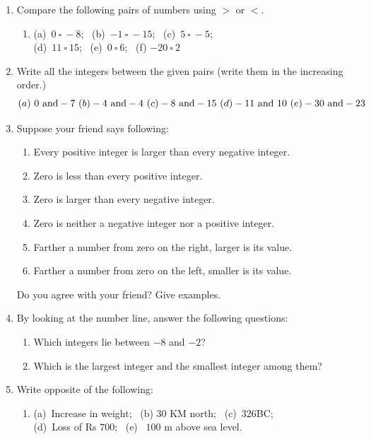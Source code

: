 \documentclass[a4paper,leqno,12pt]{amsart}
\begin{document}
\begin{enumerate}
\setlength\itemsep{1em}
\item Compare the following pairs of numbers using $>$ or $<$.
\begin{enumerate}
\item[] (a)\ $0 \ \square \ -8$; \ (b)\ $-1\ \square \ -15$; \ (c)\ $5\ \square \ -5$; \\ 
(d)\ $11\ \square \ 15$; \ (e)\ $0\ \square \ 6$; \ (f) $-20\ \square \ 2$
\end{enumerate}

\item Write all the integers between the given pairs (write them in the increasing
order.)
\[
(a)\ 0 \ {\rm and} -7 \ (b) -4 \ {\rm and} -4 \ (c) -8 \ {\rm and} -15 \ (d) -11 \ {\rm and} \ 10 \ (e) -30 \ {\rm and} -23
\]
\item Suppose your friend says following:
\begin{enumerate}
\item Every positive integer is larger than every negative integer.
\item Zero is less than every positive integer.
\item Zero is larger than every negative integer.
\item Zero is neither a negative integer nor a positive integer.
\item Farther a number from zero on the right, larger is its value.
\item Farther a number from zero on the left, smaller is its value.
\end{enumerate}
Do you agree with your friend? Give examples.

\item By looking at the number line, answer the following questions:
\begin{enumerate}
\item Which integers lie between $-8$ and $-2$?
\item Which is the largest integer and the smallest integer among them?
\end{enumerate}

\item Write opposite of the following:
\begin{enumerate}
\item[] (a)\  Increase in weight; \ (b) $30$ KM north; \ (c)\ $326$BC;\\
(d)\ Loss of Rs $700$; \ (e) \ $100$ m above sea level.
\end{enumerate}


\end{enumerate}
\end{document}
